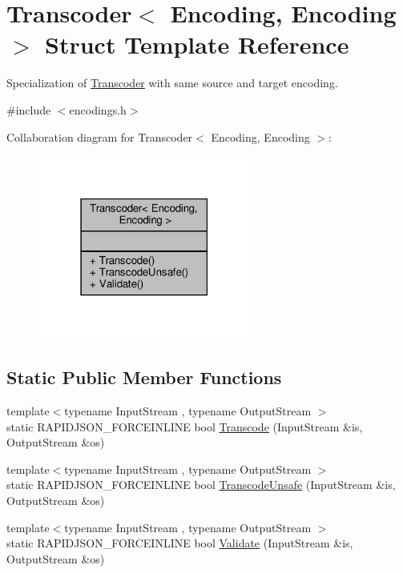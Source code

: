 \hypertarget{structTranscoder_3_01Encoding_00_01Encoding_01_4}{}\section{Transcoder$<$ Encoding, Encoding $>$ Struct Template Reference}
\label{structTranscoder_3_01Encoding_00_01Encoding_01_4}


Specialization of \hyperlink{structTranscoder}{Transcoder} with same source and target encoding.  




{\ttfamily \#include $<$encodings.\+h$>$}



Collaboration diagram for Transcoder$<$ Encoding, Encoding $>$\+:
\nopagebreak
\begin{figure}[H]
\begin{center}
\leavevmode
\includegraphics[width=198pt]{structTranscoder_3_01Encoding_00_01Encoding_01_4__coll__graph}
\end{center}
\end{figure}
\subsection*{Static Public Member Functions}
\begin{DoxyCompactItemize}
\item 
{\footnotesize template$<$typename Input\+Stream , typename Output\+Stream $>$ }\\static R\+A\+P\+I\+D\+J\+S\+O\+N\+\_\+\+F\+O\+R\+C\+E\+I\+N\+L\+I\+NE bool \hyperlink{structTranscoder_3_01Encoding_00_01Encoding_01_4_aad11cdc2b829123a7b9969e34d456813}{Transcode} (Input\+Stream \&is, Output\+Stream \&os)
\item 
{\footnotesize template$<$typename Input\+Stream , typename Output\+Stream $>$ }\\static R\+A\+P\+I\+D\+J\+S\+O\+N\+\_\+\+F\+O\+R\+C\+E\+I\+N\+L\+I\+NE bool \hyperlink{structTranscoder_3_01Encoding_00_01Encoding_01_4_addf67decfff7d0de510c47842eb53cef}{Transcode\+Unsafe} (Input\+Stream \&is, Output\+Stream \&os)
\item 
{\footnotesize template$<$typename Input\+Stream , typename Output\+Stream $>$ }\\static R\+A\+P\+I\+D\+J\+S\+O\+N\+\_\+\+F\+O\+R\+C\+E\+I\+N\+L\+I\+NE bool \hyperlink{structTranscoder_3_01Encoding_00_01Encoding_01_4_a536aa3930251161d05e112947ec2f9c8}{Validate} (Input\+Stream \&is, Output\+Stream \&os)
\end{DoxyCompactItemize}


